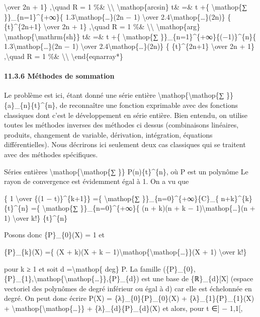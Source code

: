 \documentclass[]{article}
\begin{document}
\textbackslash{}over 2n + 1\} ,\textbackslash{}quad R = 1 \%\&
\textbackslash{}\textbackslash{} \textbackslash{}mathop\{arcsin\} t\&
=\& t +\{ \textbackslash{}mathop\{∑ \}\}\_\{n=1\}\^{}\{+∞\}\{
1.3\textbackslash{}mathop\{\ldots{}\}(2n − 1) \textbackslash{}over
2.4\textbackslash{}mathop\{\ldots{}\}(2n)\} \{ \{t\}\^{}\{2n+1\}
\textbackslash{}over 2n + 1\} ,\textbackslash{}quad R = 1 \%\&
\textbackslash{}\textbackslash{} \textbackslash{}mathop\{arg\}
\textbackslash{}mathop\{\textbackslash{}mathrm\{sh\}\} t\& =\& t +\{
\textbackslash{}mathop\{∑ \}\}\_\{n=1\}\^{}\{+∞\}\{(−1)\}\^{}\{n\}\{
1.3\textbackslash{}mathop\{\ldots{}\}(2n − 1) \textbackslash{}over
2.4\textbackslash{}mathop\{\ldots{}\}(2n)\} \{ \{t\}\^{}\{2n+1\}
\textbackslash{}over 2n + 1\} ,\textbackslash{}quad R = 1 \%\&
\textbackslash{}\textbackslash{} \textbackslash{}end\{eqnarray*\}

\paragraph{11.3.6 Méthodes de sommation}

Le problème est ici, étant donné une série entière
\textbackslash{}mathop\{\textbackslash{}mathop\{∑ \}\}
\{a\}\_\{n\}\{t\}\^{}\{n\}, de reconnaître une fonction exprimable avec
des fonctions classiques dont c'est le développement en série entière.
Bien entendu, on utilise toutes les méthodes inverses des méthodes ci
dessus (combinaisons linéaires, produits, changement de variable,
dérivation, intégration, équations différentielles). Nous décrirons ici
seulement deux cas classiques qui se traitent avec des méthodes
spécifiques.

Séries entières \textbackslash{}mathop\{\textbackslash{}mathop\{∑ \}\}
P(n)\{t\}\^{}\{n\}, où P est un polynôme Le rayon de convergence est
évidemment égal à 1. On a vu que

\{ 1 \textbackslash{}over \{(1 − t)\}\^{}\{k+1\}\} =\{
\textbackslash{}mathop\{∑ \}\}\_\{n=0\}\^{}\{+∞\}\{C\}\_\{
n+k\}\^{}\{k\}\{t\}\^{}\{n\} =\{ \textbackslash{}mathop\{∑
\}\}\_\{n=0\}\^{}\{+∞\}\{ (n + k)(n + k −
1)\textbackslash{}mathop\{\ldots{}\}(n + 1) \textbackslash{}over k!\}
\{t\}\^{}\{n\}

Posons donc \{P\}\_\{0\}(X) = 1 et

\{P\}\_\{k\}(X) =\{ (X + k)(X + k −
1)\textbackslash{}mathop\{\textbackslash{}mathop\{\ldots{}\}\}(X + 1)
\textbackslash{}over k!\}

pour k ≥ 1 et soit d =\textbackslash{}mathop\{ deg\} P. La famille
(\{P\}\_\{0\},\{P\}\_\{1\},\textbackslash{}mathop\{\textbackslash{}mathop\{\ldots{}\}\},\{P\}\_\{d\})
est une base de \{ℝ\}\_\{d\}{[}X{]} (espace vectoriel des polynômes de
degré inférieur ou égal à d) car elle est échelonnée en degré. On peut
donc écrire P(X) = \{λ\}\_\{0\}\{P\}\_\{0\}(X) +
\{λ\}\_\{1\}\{P\}\_\{1\}(X) +
\textbackslash{}mathop\{\textbackslash{}mathop\{\ldots{}\}\} +
\{λ\}\_\{d\}\{P\}\_\{d\}(X) et alors, pour t ∈{]} − 1,1{[},
\end{document}
